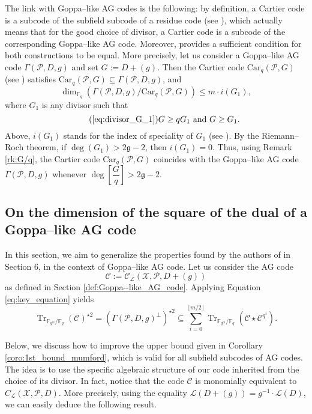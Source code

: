 \documentclass[a4paper]{amsart}
\theoremstyle{definition}
\theoremstyle{remark}
\newcommand{\calP}{\mathcal{P}}
\newcommand{\calL}{\mathcal{L}}
\newcommand{\calC}{\mathcal{C}}
\newcommand{\calX}{\mathcal{X}}
\newcommand{\fqm}{\mathbb{F}_{q^m}}
\newcommand{\fq}{\mathbb{F}_{q}}
\newcommand{\Tr}[1]{\operatorname{Tr}_{\mathbb{F}_{q^m}/\fq}\left(#1\right)}
\begin{document}
The link with Goppa--like AG codes is the following: by definition, a Cartier code is a subcode of the subfield subcode of a residue code (see \cite[Proposition 4.3]{Cou14}), which actually means that for the good choice of divisor, a Cartier code is a subcode of the corresponding Goppa--like AG code. Moreover, \cite[Theorem 5.1]{Cou14} provides a sufficient condition for both constructions to be equal. More precisely, let us consider a Goppa--like AG code $\Gamma(\calP,D,g)$  and set $G := D+(g)$. Then the Cartier code $\mathrm{Car}_q(\calP,G)$ (see \cite[Definition 4.2]{Cou14}) satisfies $\mathrm{Car}_q(\calP,G) \subseteq \Gamma(\calP,D,g)$, and 
$$ \dim_{\fq} \left( \Gamma(\calP,D,g)/ \mathrm{Car}_q(\calP,G)\right) \leq m \cdot i(G_1),$$
where $G_1$ is any divisor such that 
\begin{equation} \tag{\ref{eq:divisor_G_1}}
G \geq qG_1 \ \mathrm{and} \ G \geq G_1.
\end{equation}
 Above, $i(G_1)$ stands for the index of speciality of $G_1$ (see \cite[Definition~1.6.10]{Sti09}). By the Riemann--Roch theorem, if $\deg(G_1) > 2\mathfrak{g}-2$, then $i(G_1) =0.$ 
Thus, using Remark \ref{rk:G/q}, the Cartier code $\mathrm{Car}_q(\calP,G)$ coincides with the Goppa--like AG code $\Gamma(\calP,D,g)$ whenever $\deg\left[\dfrac{G}{q} \right] > 2\mathfrak{g}-2$. 

\subsection{On the dimension of the square of the dual of a Goppa--like AG code} \label{section:1st_improvement}
In this section, we aim to generalize the properties found by the authors of \cite{MT21} in Section 6, in the context of Goppa--like AG code. Let us consider the AG code 
$$\calC := \calC_{\calL}(\calX,\calP,D+(g))$$
as defined in Section \ref{def:Goppa--like_AG_code}. Applying Equation \eqref{eq:key_equation} yields   
\begin{equation} \label{eq:key_equation_Goppa--like} 
\Tr{\calC}^{\star 2} = (\Gamma(\calP,D,g)^{\perp})^{\star2} \subseteq \sum\limits_{i=0}^{\lfloor{m/2} \rfloor} \Tr{\calC\star \calC^{q^i}}.
\end{equation}

Below, we discuss how to improve the upper bound given in Corollary \ref{coro:1st_bound_mumford}, which is valid for all subfield subcodes of AG codes. The idea is to use the specific algebraic structure of our code inherited from the choice of its divisor.
\noindent In fact, notice that the code $\calC$ is monomially equivalent to $C_{\calL}(\calX,\calP,D)$. 
More precisely, using the equality $\calL(D+(g)) = g^{-1} \cdot \calL(D),$
we can easily deduce the following result.
\end{document}
